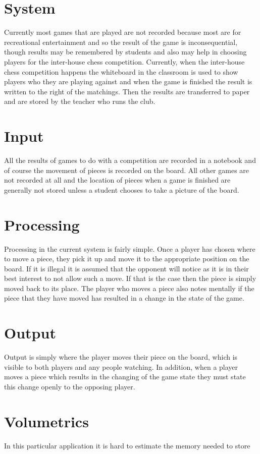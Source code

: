 \documentclass[]{report}
\begin{document}
\section{System}
Currently most games that are played are not recorded because most are for recreational entertainment and so the result of the game is inconsequential, though results may be remembered by students and also may help in choosing players for the inter-house chess competition. Currently, when the inter-house chess competition happens the whiteboard in the classroom is used to show players who they are playing against and when the game is finished the result is written to the right of the matchings. Then the results are transferred to paper and are stored by the teacher who runs the club.
\section{Input}
All the results of games to do with a competition are recorded in a notebook and of course the movement of pieces is recorded on the board. All other games are not recorded at all and the location of pieces when a game is finished are generally not stored unless a student chooses to take a picture of the board.
\section{Processing}
Processing in the current system is fairly simple. Once a player has chosen where to move a piece, they pick it up and move it to the appropriate position on the board. If it is illegal it is assumed that the opponent will notice as it is in their best interest to not allow such a move. If that is the case then the piece is simply moved back to its place. The player who moves a piece also notes mentally if the piece that they have moved has resulted in a change in the state of the game.
\section{Output}
Output is simply where the player moves their piece on the board, which is visible to both players and any people watching. In addition, when a player moves a piece which results in the changing of the game state they must state this change openly to the opposing player.
\section{Volumetrics}
In this particular application it is hard to estimate the memory needed to store
\end{document}
